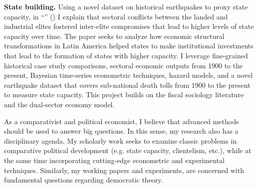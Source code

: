 {\bf State building.} Using a novel dataset on historical earthquakes to proxy state capacity, in ``\href{https://github.com/hbahamonde/Earthquake_Paper/raw/master/Bahamonde_Earthquake_Paper.pdf}{{\unskip}}'' ({\unskip}) I explain that sectoral conflicts between the landed and industrial elites fostered inter-elite compromises that lead to higher levels of state capacity over time. The paper seeks to analyze how economic structural transformations in Latin America helped states to make institutional investments that lead to the formation of states with higher capacity. I leverage fine-grained historical case study comparisons, sectoral economic outputs from 1900 to the present, Bayesian time-series econometric techniques, hazard models, and a novel earthquake dataset that covers sub-national death tolls from 1900 to the present to measure state capacity. This project builds on the fiscal sociology literature and the dual-sector economy model. 


As a comparativist and political economist, I believe that advanced methods should be used to answer big questions. In this sense, my research also has a disciplinary agenda. My scholarly work seeks to examine classic problems in comparative political development (e.g. state capacity, clientelism, etc.), while at the same time incorporating cutting-edge econometric and experimental techniques. Similarly, my working papers and experiments, are concerned with fundamental questions regarding democratic theory.

